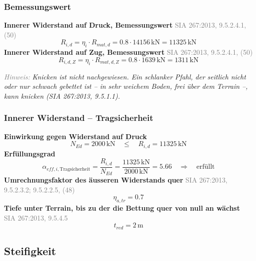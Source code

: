 \documentclass[11pt,a4paper]{article}
\newcommand{\normref}[1]{{\small\textcolor{gray}{#1}}}
\newcommand{\hinweis}[2]{\par\noindent\textcolor{gray}{\textit{#1:}} \textit{#2}\par}
\begin{document}
\subsubsection{Bemessungswert}
\noindent\textbf{Innerer Widerstand auf Druck, Bemessungswert} \hfill \normref{SIA 267:2013, 9.5.2.4.1, (50)}
\begin{equation*}
R_{i,d} = \eta_i \cdot R_{mat,d} = 0.8 \cdot 14156\,\mathrm{kN} = 11325\,\mathrm{kN}
\end{equation*}
\noindent\textbf{Innerer Widerstand auf Zug, Bemessungswert} \hfill \normref{SIA 267:2013, 9.5.2.4.1, (50)}
\begin{equation*}
R_{i,d,Z} = \eta_i \cdot R_{mat,d,Z} = 0.8 \cdot 1639\,\mathrm{kN} = 1311\,\mathrm{kN}
\end{equation*}
\hinweis{Hinweis}{Knicken ist nicht nachgewiesen. Ein schlanker Pfahl, der seitlich nicht oder nur schwach gebettet ist – in sehr weichem Boden, frei über dem Terrain –, kann knicken (SIA 267:2013, 9.5.1.1).}
\subsubsection{Innerer Widerstand – Tragsicherheit}
\noindent\textbf{Einwirkung gegen Widerstand auf Druck}
\begin{equation*}
N_{Ed} = 2000\,\mathrm{kN} \quad \le \quad R_{i,d} = 11325\,\mathrm{kN}
\end{equation*}
\noindent\textbf{Erfüllungsgrad}
\begin{equation*}
\alpha_{eff,i,\text{Tragsicherheit}} = \frac{R_{i,d}}{N_{Ed}} = \frac{11325\,\mathrm{kN}}{2000\,\mathrm{kN}} = 5.66 \quad \Rightarrow \quad \text{erfüllt}
\end{equation*}
\noindent\textbf{Umrechnungsfaktor des äusseren Widerstands quer} \hfill \normref{SIA 267:2013, 9.5.2.3.2; 9.5.2.2.5, (48)}
\begin{equation*}
\eta_{a,tr} = 0.7
\end{equation*}
\noindent\textbf{Tiefe unter Terrain, bis zu der die Bettung quer von null an wächst} \hfill \normref{SIA 267:2013, 9.5.4.5}
\begin{equation*}
t_{red} = 2\,\mathrm{m}
\end{equation*}
\subsection{Steifigkeit}
\end{document}

